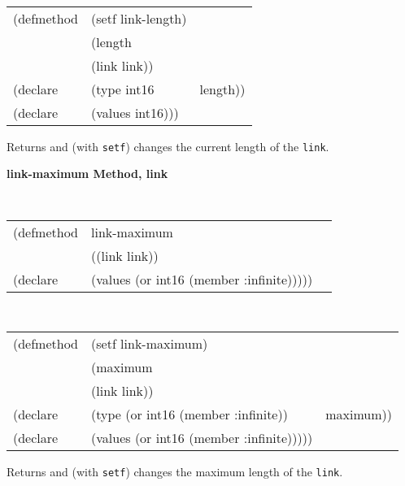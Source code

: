 {\samepage
\begin{flushright} \parbox[t]{6.125in}{
\tt
\begin{tabular}{lll}
\raggedright
(defmethod & (setf link-length) & \\
         & (length \\
         & (link link)) \\
(declare &(type int16 & length))\\
(declare &(values int16)))
\end{tabular}
\rm
}
\end{flushright}}



\begin{flushright} \parbox[t]{6.125in}{
Returns and (with {\tt setf}) changes the current length of the {\tt link}.

}\end{flushright}

{\samepage
{\large {\bf link-maximum \hfill Method, link}}
\begin{flushright} \parbox[t]{6.125in}{
\tt
\begin{tabular}{lll}
\raggedright
(defmethod & link-maximum & \\
           & ((link  link)) \\
(declare   & (values (or int16 (member :infinite)))))
\end{tabular}
\rm

}\end{flushright}}

{\samepage
\begin{flushright} \parbox[t]{6.125in}{
\tt
\begin{tabular}{lll}
\raggedright
(defmethod & (setf link-maximum) & \\
         & (maximum \\
         & (link link)) \\
(declare &(type (or int16 (member :infinite)) & maximum))\\
(declare &(values (or int16 (member :infinite)))))
\end{tabular}
\rm
}
\end{flushright}}



\begin{flushright} \parbox[t]{6.125in}{
Returns and (with {\tt setf}) changes the maximum length of the {\tt link}.

}\end{flushright}


